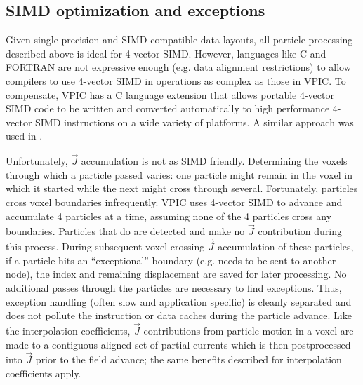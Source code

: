 \documentclass[10pt]{article}
\newcommand{\vecJ}{\vec{J}}
\begin{document}
\subsection{SIMD optimization and exceptions}

Given single precision and SIMD compatible data layouts, all particle
processing described above is ideal for 4-vector SIMD.  However,
languages like C and FORTRAN are not expressive enough (e.g. data
alignment restrictions) to allow compilers to use 4-vector SIMD in
operations as complex as those in VPIC.  To compensate, VPIC has a C
language extension that allows portable 4-vector SIMD code to be
written and converted automatically to high performance 4-vector SIMD
instructions on a wide variety of platforms.  A similar approach was
used in \cite{Bowers_et_al_2006}.


Unfortunately, $\vecJ$ accumulation is not as SIMD friendly.
Determining the voxels through which a particle passed varies: one
particle might remain in the voxel in which it started while the next
might cross through several.  Fortunately, particles cross voxel
boundaries infrequently.  VPIC uses 4-vector SIMD to advance and
accumulate 4 particles at a time, assuming none of the 4 particles
cross any boundaries.  Particles that do are detected and make no
$\vecJ$ contribution during this process.  During subsequent voxel
crossing $\vecJ$ accumulation of these particles, if a particle hits
an ``exceptional'' boundary (e.g. needs to be sent to another node), the
index and remaining displacement are saved for later processing.  No
additional passes through the particles are necessary to find
exceptions.  Thus, exception handling (often slow and application
specific) is cleanly separated and does not pollute the instruction or
data caches during the particle advance.  Like the interpolation
coefficients, $\vecJ$ contributions from particle motion in a voxel
are made to a contiguous aligned set of partial currents which is then
postprocessed into $\vecJ$ prior to the field advance; the same
benefits described for interpolation coefficients apply.
\end{document}
